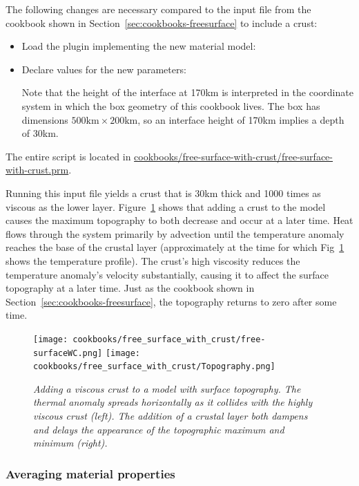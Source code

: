 \documentclass{article}
\begin{document}
The following changes are necessary compared to the input file from the
cookbook shown in Section~\ref{sec:cookbooks-freesurface} to include a crust:
\begin{itemize}
  \item Load the plugin implementing the new material model:
  
  
  \item Declare values for the new parameters:
  
  Note that the height of the interface at 170km is interpreted in the
  coordinate system in which the box geometry of this cookbook lives. The box
  has dimensions $500\text{km}\times 200\text{km}$, so an interface height of
  170km implies a depth of 30km.
\end{itemize}

The entire script is located in
\url{cookbooks/free-surface-with-crust/free-surface-with-crust.prm}.

Running this input file yields a
crust that is 30km thick and 1000 times as viscous as the lower layer.
Figure~\ref{fig:freesurfaceWC} shows that adding a crust to the model causes the maximum topography to both decrease and occur at a later time.
Heat flows through the system primarily by advection until the temperature anomaly reaches the base of the
crustal layer (approximately at the time for which Fig~\ref{fig:freesurfaceWC}
shows the temperature profile).
The crust's high viscosity reduces the temperature anomaly's velocity
substantially, causing it to affect the surface topography at a later time. Just
as the cookbook shown in Section~\ref{sec:cookbooks-freesurface}, the
topography returns to zero after some time.

\begin{figure}
  \centering
  \texttt{[image: cookbooks/free\_surface\_with\_crust/free-surfaceWC.png]}
  \hfill
  \texttt{[image: cookbooks/free\_surface\_with\_crust/Topography.png]}
  \caption{\it Adding a viscous crust to a model with surface topography. The
  thermal anomaly spreads horizontally as it collides with the highly viscous crust (left). The addition of a crustal layer both dampens and delays the appearance of the topographic maximum and minimum (right). }
  \label{fig:freesurfaceWC}
\end{figure}


\subsubsection{Averaging material properties}
\label{sec:sinker-with-averaging}
\end{document}
